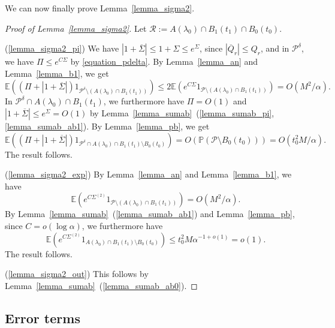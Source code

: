 \documentclass{article}
\theoremstyle{plain}
\theoremstyle{remark}
\theoremstyle{plain}
\numberwithin{equation}{section}
\begin{document}
	We can now finally prove Lemma~\ref{lemma_sigma2}.
	
	\begin{proof}[Proof of Lemma~\ref{lemma_sigma2}]
		Let $\mathcal{R}:=A(\lambda_0)\cap B_1(t_1)\cap B_0(t_0)$.
		
		(\ref{lemma_sigma2_pi}) We have $|1+\overline{\Sigma}|\leq1+\Sigma\leq e^{\Sigma}$, since $|\overline{Q}_r|\leq Q_r$, and in $\mathcal{P}^{\delta}$, we have $\Pi\leq e^{C\Sigma}$ by \eqref{equation_pdelta}. By Lemma~\ref{lemma_an} and Lemma~\ref{lemma_b1}, we get $$\mathbb{E}((\Pi+|1+\overline{\Sigma}|)1_{\mathcal{P}^{\delta}\setminus(A(\lambda_0)\cap B_1(t_1))})\leq2\mathbb{E}(e^{C\Sigma}1_{\mathcal{P}\setminus(A(\lambda_0)\cap B_1(t_1))})=O(M^2/\alpha).$$ In $\mathcal{P}^{\delta}\cap A(\lambda_0)\cap B_1(t_1)$, we furthermore have $\Pi=O(1)$ and $|1+\overline{\Sigma}|\leq e^{\Sigma}=O(1)$ by Lemma~\ref{lemma_sumab}~(\ref{lemma_sumab_pi},\ref{lemma_sumab_ab1}). By Lemma~\ref{lemma_pb}, we get $$\mathbb{E}((\Pi+|1+\overline{\Sigma}|)1_{\mathcal{P}^{\delta}\cap A(\lambda_0)\cap B_1(t_1)\setminus B_0(t_0)})=O(\mathbb{P}(\mathcal{P}\setminus B_0(t_0)))=O(t_0^2M/\alpha).$$ The result follows.
		
		(\ref{lemma_sigma2_exp}) By Lemma~\ref{lemma_an} and Lemma~\ref{lemma_b1}, we have $$\mathbb{E}(e^{C\Sigma^{(2)}}1_{\mathcal{P}\setminus(A(\lambda_0)\cap B_1(t_1))})=O(M^2/\alpha).$$ By Lemma~\ref{lemma_sumab}~(\ref{lemma_sumab_ab1}) and Lemma~\ref{lemma_pb}, since $C=o(\log\alpha)$, we furthermore have $$\mathbb{E}(e^{C\Sigma^{(2)}}1_{A(\lambda_0)\cap B_1(t_1)\setminus B_0(t_0)})\leq t_0^2M\alpha^{-1+o(1)}=o(1).$$ The result follows.
		
		(\ref{lemma_sigma2_out}) This follows by Lemma~\ref{lemma_sumab}~(\ref{lemma_sumab_ab0}).
	\end{proof}
	
	\subsection{Error terms}\label{subsection_proof_error}
	
\end{document}
